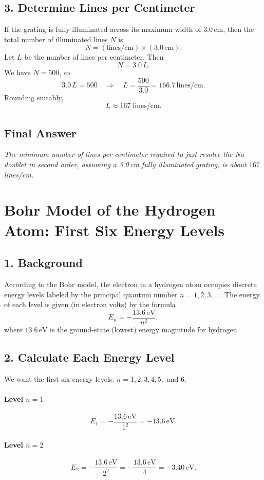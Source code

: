 \documentclass[12pt]{article}
\theoremstyle{definition} %
\theoremstyle{plain} %
\begin{document}
\subsection*{3. Determine Lines per Centimeter}
If the grating is fully illuminated across its maximum width of \(3.0\,\text{cm}\), 
then the total number of illuminated lines \(N\) is
\[
N = (\text{lines/cm}) \times (3.0\,\text{cm}).
\]
Let \(L\) be the number of lines per centimeter. Then
\[
N = 3.0 \, L.
\]
We have \(N = 500\), so
\[
3.0 \, L = 500
\quad \Longrightarrow \quad
L = \frac{500}{3.0}
= 166.7 \,\text{lines/cm}.
\]
Rounding suitably,
\[
\boxed{L \approx 167\;\text{lines/cm}.}
\]

\subsection*{Final Answer}
\noindent
\emph{The minimum number of lines per centimeter required 
to just resolve the Na doublet in second order, assuming a 
3.0\,cm fully illuminated grating, is about \(167\)\,lines/cm.}


\section*{Bohr Model of the Hydrogen Atom: First Six Energy Levels}

\subsection*{1. Background}
According to the Bohr model, the electron in a hydrogen atom occupies discrete energy levels 
labeled by the principal quantum number \(n = 1, 2, 3, \dots\). 
The energy of each level is given (in electron volts) by the formula
\[
E_n = -\frac{13.6\,\text{eV}}{n^2},
\]
where \(13.6\,\text{eV}\) is the ground-state (lowest) energy magnitude for hydrogen.

\subsection*{2. Calculate Each Energy Level}
We want the first six energy levels: \(n = 1, 2, 3, 4, 5,\) and \(6\).

\paragraph{Level \(n=1\)}
\[
E_1 
= -\frac{13.6\,\text{eV}}{1^2} 
= -13.6\,\text{eV}.
\]

\paragraph{Level \(n=2\)}
\[
E_2 
= -\frac{13.6\,\text{eV}}{2^2} 
= -\frac{13.6\,\text{eV}}{4} 
= -3.40\,\text{eV}.
\]
\end{document}
